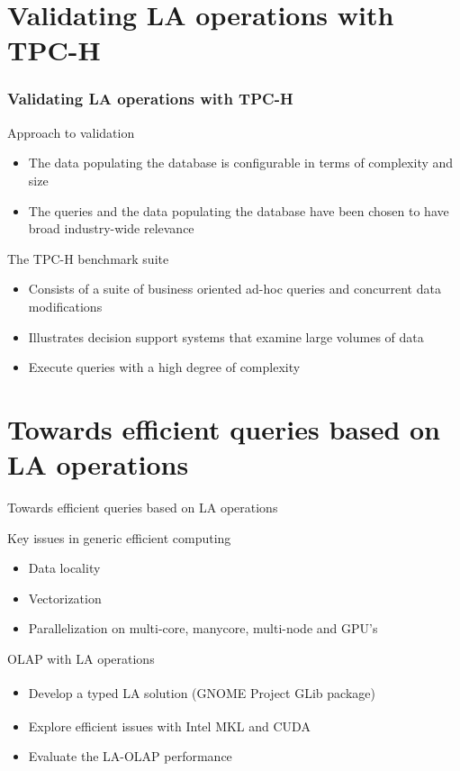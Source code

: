 \documentclass{beamer}
\begin{document}
\section{Validating LA operations with TPC-H}
\begin{frame}
\frametitle{Validating LA operations with TPC-H}

\begin{block}{Approach to validation}
    \begin{itemize}
        \item The data populating the database is configurable in terms of complexity and size
        \item The queries and the data populating the database have been chosen to have broad industry-wide relevance
    \end{itemize}
\end{block}

\begin{block}{The TPC-H benchmark suite}
\begin{itemize}
    \item Consists of a suite of business oriented ad-hoc queries and concurrent data modifications
    \item Illustrates decision support systems that examine large volumes of data
    \item Execute queries with a high degree of complexity
\end{itemize}
\end{block}
\end{frame}

\section{Towards efficient queries based on LA operations}
\begin{frame}{Towards efficient queries based on LA operations}

\begin{block}{Key issues in generic efficient computing}
    \begin{itemize}
        \item Data locality
        \item Vectorization
        \item Parallelization on multi-core, manycore, multi-node and GPU's
    \end{itemize}
\end{block}

\begin{block}{OLAP with LA operations}
\begin{itemize}
        \item Develop a typed LA solution (GNOME\textsuperscript{\tiny\textregistered} Project  GLib package)
        \item Explore efficient issues with Intel\textsuperscript{\tiny\textregistered} MKL and CUDA\textsuperscript{\tiny\textregistered}
        \item Evaluate the LA-OLAP performance
    \end{itemize}
\end{block}

\end{frame}
\end{document}
